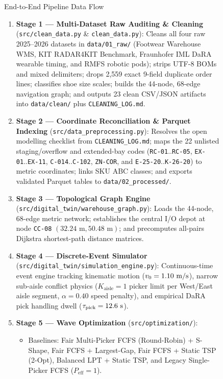 \documentclass[11pt,a4paper]{article}
\begin{document}
\begin{figure}[h!]
\centering
\begin{callout}{End-to-End Pipeline Data Flow}
\begin{enumerate}[leftmargin=*]
    \item \textbf{Stage 1 --- Multi-Dataset Raw Auditing \& Cleaning} (\texttt{src/clean\_data.py} \& \texttt{clean\_data.py}): Cleans all four raw 2025--2026 datasets in \texttt{data/01\_raw/} (Footwear Warehouse WMS, KIT RADAR4KIT Benchmark, Fraunhofer IML DaRA wearable timing, and RMFS robotic pods); strips UTF-8 BOMs and mixed delimiters; drops 2,559 exact 9-field duplicate order lines; classifies shoe size scales; builds the 44-node, 68-edge navigation graph; and outputs 23 clean CSV/JSON artifacts into \texttt{data/clean/} plus \texttt{CLEANING\_LOG.md}.
    \item \textbf{Stage 2 --- Coordinate Reconciliation \& Parquet Indexing} (\texttt{src/data\_preprocessing.py}): Resolves the open modelling checklist from \texttt{CLEANING\_LOG.md}; maps the 22 unlisted staging/overflow and extended-bay codes (\texttt{RC-01}..\texttt{RC-05}, \texttt{EX-01}..\texttt{EX-11}, \texttt{C-014}..\texttt{C-102}, \texttt{ZN-COR}, and \texttt{E-25-20}..\texttt{K-26-20}) to metric coordinates; links SKU ABC classes; and exports validated Parquet tables to \texttt{data/02\_processed/}.
    \item \textbf{Stage 3 --- Topological Graph Engine} (\texttt{src/digital\_twin/warehouse\_graph.py}): Loads the 44-node, 68-edge metric network; establishes the central I/O depot at node \texttt{CC-08} $(32.24\text{ m}, 50.48\text{ m})$; and precomputes all-pairs Dijkstra shortest-path distance matrices.
    \item \textbf{Stage 4 --- Discrete-Event Simulator} (\texttt{src/digital\_twin/simulation\_engine.py}): Continuous-time event engine tracking kinematic motion ($v_0 = 1.10\text{ m/s}$), narrow sub-aisle conflict physics ($K_{\text{aisle}}=1$ picker limit per West/East aisle segment, $\alpha=0.40$ speed penalty), and empirical DaRA pick handling dwell ($\tau_{\text{pick}} = 12.6\text{ s}$).
    \item \textbf{Stage 5 --- Wave Optimization} (\texttt{src/optimization/}): 
    \begin{itemize}
        \item Baselines: Fair Multi-Picker FCFS (Round-Robin) + S-Shape, Fair FCFS + Largest-Gap, Fair FCFS + Static TSP (2-Opt), Balanced LPT + Static TSP, and Legacy Single-Picker FCFS ($P_{\text{eff}}=1$).

\end{itemize}
\end{enumerate}
\end{callout}
\end{figure}
\end{document}
